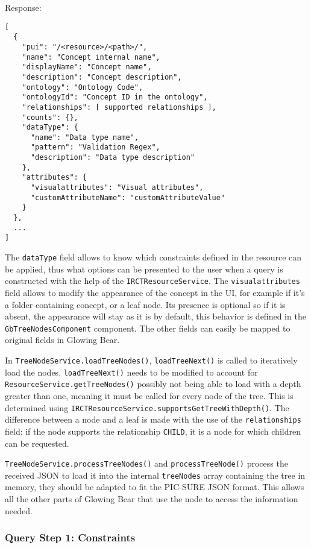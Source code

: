 Response:
\begin{verbatim}
[
  {
    "pui": "/<resource>/<path>/",
    "name": "Concept internal name",
    "displayName": "Concept name",
    "description": "Concept description",
    "ontology": "Ontology Code",
    "ontologyId": "Concept ID in the ontology",
    "relationships": [ supported relationships ],
    "counts": {},
    "dataType": {
      "name": "Data type name",
      "pattern": "Validation Regex",
      "description": "Data type description"
    },
    "attributes": {
      "visualattributes": "Visual attributes",
      "customAttributeName": "customAttributeValue"
    }
  },
  ...
]
\end{verbatim}

The \verb|dataType| field allows to know which constraints defined in the resource can be applied, thus what options can be presented to the user when a query is constructed with the help of the \verb|IRCTResourceService|.
The \verb|visualattributes| field allows to modify the appearance of the concept in the UI, for example if it's a folder containing concept, or a leaf node. 
Its presence is optional so if it is absent, the appearance will stay as it is by default, this behavior is defined in the \verb|GbTreeNodesComponent| component.
The other fields can easily be mapped to original fields in Glowing Bear.

In \verb|TreeNodeService.loadTreeNodes()|, \verb|loadTreeNext()| is called to iteratively load the nodes.
\verb|loadTreeNext()| needs to be modified to account for \verb|ResourceService.getTreeNodes()| possibly not being able to load with a depth greater than one, meaning it must be called for every node of the tree.
This is determined using \verb|IRCTResourceService.supportsGetTreeWithDepth()|.
The difference between a node and a leaf is made with the use of the \verb|relationships| field: if the node supports the relationship \verb|CHILD|, it is a node for which children can be requested.

\verb|TreeNodeService.processTreeNodes()| and \verb|processTreeNode()| process the received JSON to load it into the internal \verb|treeNodes| array containing the tree in memory, they should be adapted to fit the PIC-SURE JSON format.
This allows all the other parts of Glowing Bear that use the node to access the information needed.


\subsubsection{Query Step 1: Constraints}

